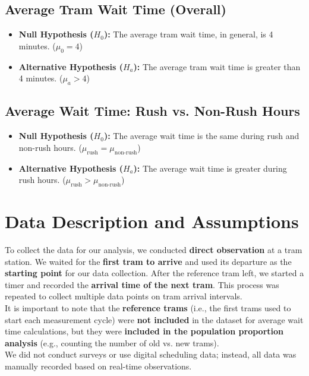 \documentclass[a4paper, 10pt]{article}
\begin{document}
		\subsection{Average Tram Wait Time (Overall)}
			\begin{itemize}
					\item \textbf{Null Hypothesis ($H_0$):} The average tram wait time, in general, is 4 minutes. ($\mu_0 = 4$)
					\item \textbf{Alternative Hypothesis ($H_a$):} The average tram wait time is greater than 4 minutes. ($\mu_a > 4$)
			\end{itemize}

		\subsection{Average Wait Time: Rush vs. Non-Rush Hours}
			\begin{itemize}
					\item \textbf{Null Hypothesis ($H_0$):} The average wait time is the same during rush and non-rush hours. ($\mu_{\text{rush}} = \mu_{\text{non-rush}}$)
					\item \textbf{Alternative Hypothesis ($H_a$):} The average wait time is greater during rush hours. ($\mu_{\text{rush}} > \mu_{\text{non-rush}}$)
			\end{itemize}

	\section{Data Description and Assumptions}

		\begin{spacing}{1.2}
			To collect the data for our analysis, we conducted \textbf{direct observation} at a tram station. 
			\noindent We waited for the \textbf{first tram to arrive} and used its departure as the \textbf{starting point} for our data collection. 
			After the reference tram left, we started a timer and recorded the \textbf{arrival time of the next tram}. 
			This process was repeated to collect multiple data points on tram arrival intervals. \\

			\noindent It is important to note that the \textbf{reference trams} (i.e., the first trams used to start each measurement cycle) were 
			\textbf{not included} in the dataset for average wait time calculations, but they were 
			\textbf{included in the population proportion analysis} (e.g., counting the number of old vs. new trams). \\

			\noindent We did not conduct surveys or use digital scheduling data; instead, all data was manually recorded based on real-time observations.
		\end{spacing}
\end{document}

